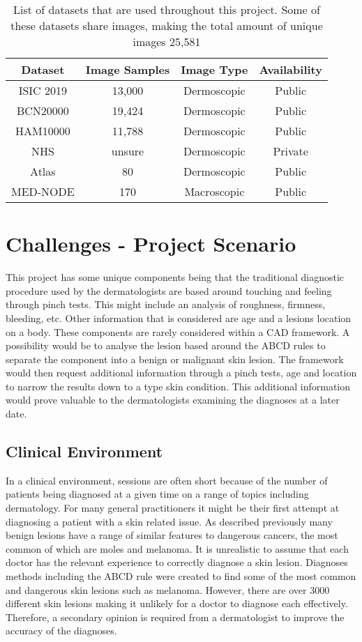 \begin{table}
\centering
\begin{tabular}{|c|c|c|c|}
	\hline
	Dataset & Image Samples & Image Type & Availability\\
	\hline
	ISIC 2019 & 13,000 & Dermoscopic & Public  \\
	\hline
	BCN20000 & 19,424 & Dermoscopic & Public \\
	\hline
	HAM10000 & 11,788 & Dermoscopic & Public  \\
	\hline
	NHS & unsure & Dermoscopic & Private \\
	\hline
	Atlas & 80 & Dermoscopic & Public \\
	\hline
	MED-NODE & 170 & Macroscopic & Public \\
	\hline
	
\end{tabular}
\caption{List of datasets that are used throughout this project. Some of these datasets share images, making the total amount of unique images 25,581}
\end{table}

\section{Challenges - Project Scenario}
This project has some unique components being that the traditional diagnostic procedure used by the dermatologists are based around touching and feeling through pinch tests. This might include an analysis of roughness, firmness, bleeding, etc. Other information that is considered are age and a lesions location on a body. These components are rarely considered within a CAD framework. A possibility would be to analyse the lesion based around the ABCD rules to separate the component into a benign or malignant skin lesion. The framework would then request additional information through a pinch tests, age and location to narrow the results down to a type skin condition. This additional information would prove valuable to the dermatologists examining the diagnoses at a later date.

\subsection{Clinical Environment}
In a clinical environment, sessions are often short because of the number of patients being diagnosed at a given time on a range of topics including dermatology. For many general practitioners it might be their first attempt at diagnosing a patient with a skin related issue. As described previously many benign lesions have a range of similar features to dangerous cancers, the most common of which are moles and melanoma. It is unrealistic to assume that each doctor has the relevant experience to correctly diagnose a skin lesion. Diagnoses methods including the ABCD rule were created to find some of the most common and dangerous skin lesions such as melanoma. However, there are over 3000 different skin lesions making it unlikely for a doctor to diagnose each effectively. Therefore, a secondary opinion is required from a dermatologist to improve the accuracy of the diagnoses.

